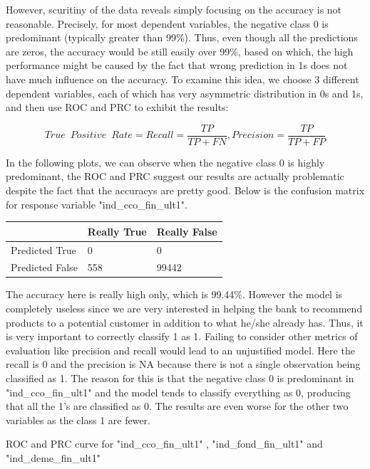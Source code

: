 \documentclass{article}
\begin{document}
\begin{spacing}{1}
\begin{large}
However, scuritiny of the data reveals simply focusing on the accuracy is not reasonable. Precisely, for most dependent variables, the negative class 0 is predominant (typically greater than 99\%). Thus, even though all the predictions are zeros, the accuracy would be still easily over 99\%, based on which, the high performance might be caused by the fact that wrong prediction in 1s does not have much influence on the accuracy. To examine this idea, we choose 3 different dependent variables, each of which has very asymmetric distribution in 0s and 1s, and then use ROC and PRC to exhibit the results:

$$True\enspace Positive\enspace Rate = Recall = \frac{TP}{TP+FN}, Precision = \frac{TP}{TP+FP}$$

In the following plots, we can observe when the negative class 0 is highly predominant, the ROC and PRC suggest our results are actually problematic despite the fact that the accuracys are pretty good. Below is the confusion matrix for response variable "ind\_cco\_fin\_ult1".

\vspace{5mm}
\begin{tabular}{| l | l | l |}
	\hline
	& Really True & Really False \\ \hline
	Predicted True & 0 & 0 \\ \hline
	Predicted False & 558 & 99442\\
	\hline
\end{tabular}
\vspace{5mm}

The accuracy here is really high only, which is 99.44\%. However the model is completely useless since we are very interested in helping the bank to recommend products to a potential customer in addition to what he/she already has. Thus, it is very important to correctly classify 1 as 1. Failing to consider other metrics of evaluation like precision and recall would lead to an unjustified model. Here the recall is 0 and the precision is NA because there is not a single observation being classified as 1. The reason for this is that the negative class 0 is predominant in "ind\_cco\_fin\_ult1" and the model tends to classify everything as 0, producing that all the 1’s are classified as 0. The results are even worse for the other two variables as the class 1 are fewer.

ROC and PRC curve for "ind\_cco\_fin\_ult1" , "ind\_fond\_fin\_ult1" and "ind\_deme\_fin\_ult1"


\end{large}
\end{spacing}
\end{document}
